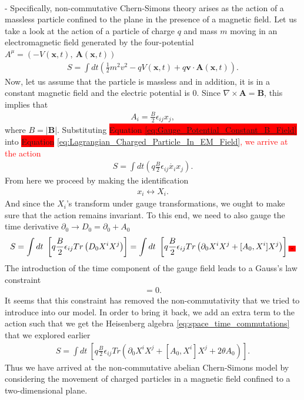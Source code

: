     \\ 
    - Specifically, non-commutative Chern-Simons theory arises as the action of a massless particle confined to the plane in the presence of a magnetic field. \cite{Polychronakos:2001mi} Let us take a look at the action of a particle of charge $q$ and mass $m$ moving in an electromagnetic field generated by the four-potential $A^{\mu} = \left(-V(\bm{x}, t), \ \bm{A}(\bm{x},t)\right)$
    \begin{align}
        S = \int dt \left(\frac{1}{2} m^2 v^2 - q V(\bm{x},t) + q \bm{v} \cdot \bm{A}(\bm{x},t)\right). \label{eq:Lagrangian_Charged_Particle_In_EM_Field}
    \end{align}
    Now, let us assume that the particle is massless and in addition, it is in a constant magnetic field and the electric potential is 0. Since $\nabla \times \bm{A} = \bm{B}$, this implies that
    \begin{align}
        A_i = \frac{B}{2} \epsilon_{i j} x_j \label{eq:Gauge_Potential_Constant_B_Field},
    \end{align}
    where $B= |\bm{B}|$.
    Substituting  \colorbox{red}{Equation \eqref{eq:Gauge_Potential_Constant_B_Field}}  into \colorbox{red}{Equation} \eqref{eq:Lagrangian_Charged_Particle_In_EM_Field}\textcolor{red}{, we arrive at the action}
    \begin{align}
        S = \int dt \left( q \frac{B}{2}\epsilon_{i j} \dot{x_i} x_j \right).
    \end{align}
    From here we proceed by making the identification
    \begin{align}
        x_i \leftrightarrow X_i.
    \end{align}
    And since the $X_i$'s transform under gauge transformations, we ought to make sure that the action remains invariant. To this end, we need to also gauge the time derivative $\partial_0 \rightarrow D_0 = \partial_0 +A_0$
    \begin{align}
        S = \int dt \ \left[ q \frac{B}{2} \epsilon_{ij} Tr \left(D_0 X^i X^j \right) \right] = \int dt \ \left[ q \frac{B}{2} \epsilon_{ij} Tr \left(\partial_0 X^i X^j + [A_0, X^i] X^j \right) \right]\colorbox{red}{.}
    \end{align}
    The introduction of the time component of the gauge field leads to a Gauss's law constraint
    \begin{align}
        [X^1, X^2] =0.
    \end{align}
    It seems that this constraint has removed the non-commutativity that we tried to introduce into our model. In order to bring it back, we add an extra term to the action such that we get the Heisenberg algebra \eqref{eq:space_time_commutations} that we explored earlier
    \begin{align}
        S =\int dt \ \left[ q \frac{B}{2} \epsilon_{ij} Tr \left(\partial_0 X^i X^j + [A_0, X^i] X^j + 2 \theta A_0 \right) \right].
    \end{align}
    Thus we have arrived at the non-commutative abelian Chern-Simons model by considering the movement of charged particles in a magnetic field confined to a two-dimensional plane.

    

